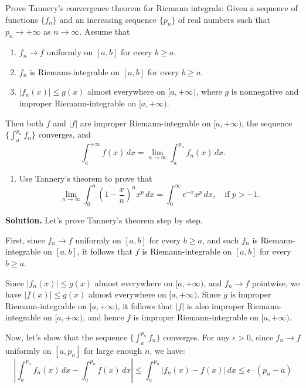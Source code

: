 \begin{problembox}
Prove Tannery's convergence theorem for Riemann integrals: Given a sequence of functions $\{f_n\}$ and an increasing sequence $\{p_n\}$ of real numbers such that $p_n \to +\infty$ as $n \to \infty$. Assume that
\begin{enumerate}[label=(\alph*)]
    \item $f_n \to f$ uniformly on $[a,b]$ for every $b \geq a$.
    \item $f_n$ is Riemann-integrable on $[a,b]$ for every $b \geq a$.
    \item $|f_n(x)| \leq g(x)$ almost everywhere on $[a,+\infty)$, where $g$ is nonnegative and improper Riemann-integrable on $[a,+\infty)$.
\end{enumerate}
Then both $f$ and $|f|$ are improper Riemann-integrable on $[a,+\infty)$, the sequence $\{\int_a^{p_n} f_n\}$ converges, and
\[\int_{a}^{+\infty} f(x) \, dx = \lim_{n \to \infty} \int_{a}^{p_n} f_n(x) \, dx.\]

\begin{enumerate}[label=(\alph*),resume]
    \item Use Tannery's theorem to prove that
    \[\lim_{n \to \infty} \int_{0}^{n} \left( 1 - \frac{x}{n} \right)^n x^p \, dx = \int_{0}^{\infty} e^{-x}x^p \, dx, \quad \text{if } p > -1.\]
\end{enumerate}
\end{problembox}

\noindent\textbf{Solution.}
Let's prove Tannery's theorem step by step.

First, since $f_n \to f$ uniformly on $[a,b]$ for every $b \geq a$, and each $f_n$ is Riemann-integrable on $[a,b]$, it follows that $f$ is Riemann-integrable on $[a,b]$ for every $b \geq a$.

Since $|f_n(x)| \leq g(x)$ almost everywhere on $[a,+\infty)$, and $f_n \to f$ pointwise, we have $|f(x)| \leq g(x)$ almost everywhere on $[a,+\infty)$. Since $g$ is improper Riemann-integrable on $[a,+\infty)$, it follows that $|f|$ is also improper Riemann-integrable on $[a,+\infty)$, and hence $f$ is improper Riemann-integrable on $[a,+\infty)$.

Now, let's show that the sequence $\{\int_a^{p_n} f_n\}$ converges. For any $\epsilon > 0$, since $f_n \to f$ uniformly on $[a, p_n]$ for large enough $n$, we have:
\[|\int_a^{p_n} f_n(x) \, dx - \int_a^{p_n} f(x) \, dx| \leq \int_a^{p_n} |f_n(x) - f(x)| \, dx \leq \epsilon \cdot (p_n - a)\]

